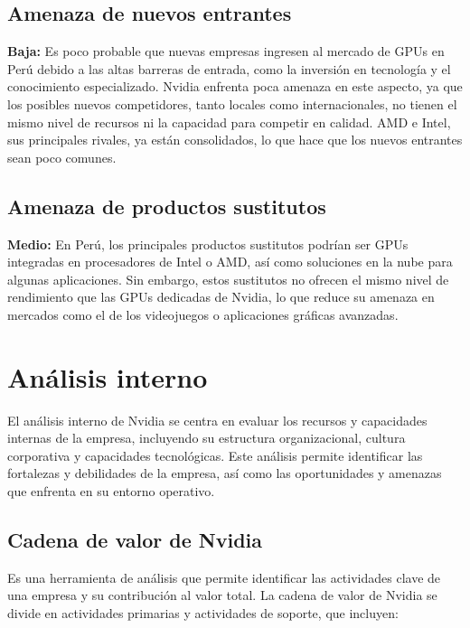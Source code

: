 \documentclass{article}
\begin{document}
\subsection{Amenaza de nuevos entrantes}

\textbf{\large{Baja:}} Es poco probable que nuevas empresas ingresen al mercado de GPUs
en Perú debido a las altas barreras de entrada, como la inversión en
tecnología y el conocimiento especializado. Nvidia enfrenta poca amenaza en
este aspecto, ya que los posibles nuevos competidores, tanto locales como
internacionales, no tienen el mismo nivel de recursos ni la capacidad para
competir en calidad. AMD e Intel, sus principales rivales, ya están
consolidados, lo que hace que los nuevos entrantes sean poco comunes.

\subsection{Amenaza de productos sustitutos}

\textbf{\large{Medio:}} En Perú, los principales productos sustitutos podrían ser GPUs integradas en
procesadores de Intel o AMD, así como soluciones en la nube para algunas
aplicaciones. Sin embargo, estos sustitutos no ofrecen el mismo nivel de
rendimiento que las GPUs dedicadas de Nvidia, lo que reduce su amenaza en
mercados como el de los videojuegos o aplicaciones gráficas avanzadas.

\newpage

\section{Análisis interno}

El análisis interno de Nvidia se centra en evaluar los recursos y capacidades internas de la empresa, incluyendo su estructura organizacional, cultura corporativa y capacidades tecnológicas. Este análisis permite identificar las fortalezas y debilidades de la empresa, así como las oportunidades y amenazas que enfrenta en su entorno operativo.

\subsection{Cadena de valor de Nvidia}

Es una herramienta de análisis que permite identificar las actividades clave de una empresa y su contribución al valor total. La cadena de valor de Nvidia se divide en actividades primarias y actividades de soporte, que incluyen:
\end{document}
